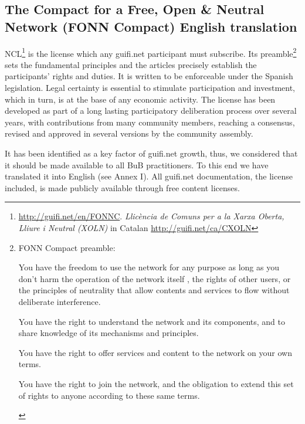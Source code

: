 \subsection{The Compact for a Free, Open \& Neutral Network (FONN Compact) English translation}


NCL\footnote{\url{http://guifi.net/en/FONNC}. \textit{Llicència de Comuns per a la Xarxa Oberta, Lliure i Neutral (XOLN)} in Catalan \url{http://guifi.net/ca/CXOLN}} is the license which any guifi.net participant must subscribe. Its preamble\footnote{
FONN Compact preamble:
\begin{itemize}
  \begin{em}
    \item You have the freedom to use the network for any purpose as long as you don't harm the operation of the network itself , the rights of other users, or the principles of neutrality that allow contents and services to flow without deliberate interference.
    \item You have the right to understand the network and its components, and to share knowledge of its mechanisms and principles.
    \item You have the right to offer services and content to the network on your own terms.
    \item You have the right to join the network, and the obligation to extend this set of rights to anyone according to these same terms.
  \end{em}
\end{itemize}
}
sets the fundamental principles and the articles precisely establish the participants' rights and duties. It is written to be enforceable under the Spanish legislation. Legal certainty is essential to stimulate participation and investment, which in turn, is at the base of any economic activity. The license has been developed as part of a long lasting participatory deliberation process over several years, with contributions from many community members, reaching a consensus, revised and approved in several versions by the community assembly.

It has been identified as a key factor of guifi.net growth, thus, we considered that it should be made available to all BuB practitioners. To this end we have translated it into English (see Annex I). All guifi.net documentation, the license included, is made publicly available through free content licenses. 


